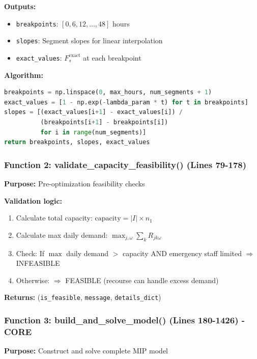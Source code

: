 \documentclass[11pt,letterpaper]{article}
\begin{document}
\textbf{Outputs:}
\begin{itemize}[leftmargin=*]
    \item \texttt{breakpoints}: $[0, 6, 12, \ldots, 48]$ hours
    \item \texttt{slopes}: Segment slopes for linear interpolation
    \item \texttt{exact\_values}: $F_s^{\text{exact}}$ at each breakpoint
\end{itemize}

\textbf{Algorithm:}
\begin{lstlisting}[language=Python, caption=PWL Generation Algorithm]
breakpoints = np.linspace(0, max_hours, num_segments + 1)
exact_values = [1 - np.exp(-lambda_param * t) for t in breakpoints]
slopes = [(exact_values[i+1] - exact_values[i]) / 
          (breakpoints[i+1] - breakpoints[i]) 
          for i in range(num_segments)]
return breakpoints, slopes, exact_values
\end{lstlisting}

\subsubsection{Function 2: validate\_capacity\_feasibility() (Lines 79-178)}
\textbf{Purpose:} Pre-optimization feasibility checks

\textbf{Validation logic:}
\begin{enumerate}[leftmargin=*]
    \item Calculate total capacity: $\text{capacity} = |I| \times n_1$
    \item Calculate max daily demand: $\max_{j,\omega} \sum_{k} R_{jk\omega}$
    \item Check: If $\max$ daily demand $>$ capacity AND emergency staff limited $\Rightarrow$ INFEASIBLE
    \item Otherwise: $\Rightarrow$ FEASIBLE (recourse can handle excess demand)
\end{enumerate}

\textbf{Returns:} (\texttt{is\_feasible}, \texttt{message}, \texttt{details\_dict})

\subsubsection{Function 3: build\_and\_solve\_model() (Lines 180-1426) - CORE}
\textbf{Purpose:} Construct and solve complete MIP model
\end{document}
